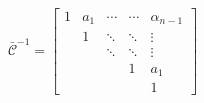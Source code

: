 \begin{equation}
\bar{\mathscr{C}}^{-1}=\begin{bmatrix}1 & a_1 & \cdots & \cdots& \alpha_{n-1}\\ & 1 & \ddots & \ddots & \vdots\\ &  & \ddots & \ddots & \vdots\\ &  &  & 1 & a_1\\  &  &  &  & 1\end{bmatrix}
\end{equation}

